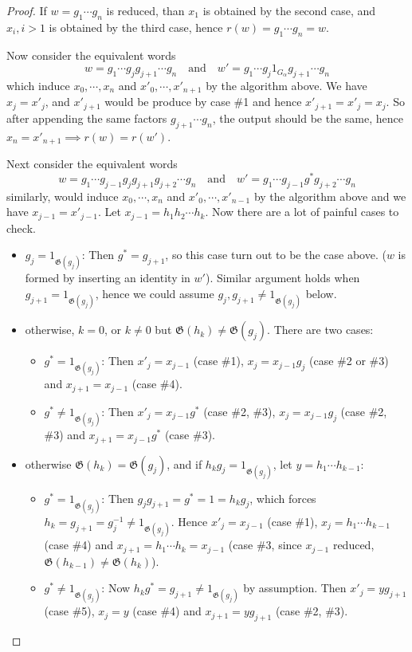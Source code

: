 \documentclass[a4paper,titlepage]{article}
\theoremstyle{remark}
\theoremstyle{definition}
\theoremstyle{theorem}
\newcommand{\gid}{\mathfrak{G}}
\begin{document}
\begin{proof}
    If $w = g_1 \cdots g_n$ is reduced, than $x_1$ is obtained by the second case, and $x_i, i > 1$ is
    obtained by the third case, hence $r(w) = g_1 \cdots g_n = w$.

    Now consider the equivalent words
    \[ w = g_1 \cdots g_j g_{j+1} \cdots g_n \quad\text{and}\quad w' = g_1 \cdots g_j 1_{G_\alpha} g_{j+1} \cdots g_n \]
    which induce $x_0, \cdots, x_n$ and $x'_0, \cdots, x'_{n+1}$ by the algorithm above.
    We have $x_j = x'_j$, and $x'_{j+1}$ would be produce by case \#1 and hence $x'_{j+1} = x'_j = x_j$.
    So after appending the same factors $g_{j+1} \cdots g_n$, the output should be the same, hence
    $x_n = x'_{n+1} \implies r(w) = r(w')$.

    Next consider the equivalent words
    \[ w = g_1 \cdots g_{j-1} g_j g_{j+1} g_{j+2} \cdots g_n 
      \quad\text{and}\quad w' = g_1 \cdots g_{j-1} g^* g_{j+2} \cdots g_n \]
    similarly, would induce $x_0, \cdots, x_n$ and $x'_0, \cdots, x'_{n-1}$ by the algorithm above and
    we have $x_{j-1} = x'_{j-1}$. Let $x_{j-1} = h_1 h_2 \cdots h_k$. 
    Now there are a lot of painful cases to check.
    \begin{itemize}
      \item $g_j = 1_{\gid(g_j)}$: Then $g^* = g_{j+1}$, so this case turn out to be the case above. ($w$
        is formed by inserting an identity in $w'$). Similar argument holds when $g_{j+1} = 1_{\gid(g_j)}$,
        hence we could assume $g_j, g_{j+1} \neq 1_{\gid(g_j)}$ below.
      \item otherwise, $k = 0$, or $k \neq 0$ but $\gid(h_k) \neq \gid(g_j)$. There are two cases:
        \begin{itemize}
          \item $g^* = 1_{\gid(g_j)}$: Then $x'_j = x_{j-1}$ (case \#1), $x_j = x_{j-1} g_j$ (case \#2 
            or \#3) and $x_{j+1} = x_{j-1}$ (case \#4).
          \item $g^* \neq 1_{\gid(g_j)}$: Then $x'_j = x_{j-1} g^*$ (case \#2, \#3),
            $x_j = x_{j-1} g_j$ (case \#2, \#3) and $x_{j+1} = x_{j-1} g^*$ (case \#3).
        \end{itemize}
      \item otherwise $\gid(h_k) = \gid(g_j)$, and if $h_k g_j = 1_{\gid(g_j)}$,
        let $y = h_1 \cdots h_{k-1}$:
        \begin{itemize}
          \item $g^* = 1_{\gid(g_j)}$: Then $g_j g_{j+1} = g^* = 1 = h_k g_j$, which forces
            $h_k = g_{j+1} = g^{-1}_j \neq 1_{\gid(g_j)}$.  
            Hence $x'_j = x_{j-1}$ (case \#1), $x_j = h_1 \cdots h_{k-1}$
            (case \#4) and $x_{j+1} = h_1 \cdots h_k = x_{j-1}$ (case \#3, since $x_{j-1}$ reduced, 
            $\gid(h_{k-1}) \neq \gid(h_k)$).
          \item $g^* \neq 1_{\gid(g_j)}$: 
            Now $h_k g^* = g_{j+1} \neq 1_{\gid(g_j)}$ by assumption. Then
              $x'_j = y g_{j+1}$ (case \#5), $x_j = y$ (case \#4) and $x_{j+1} = y g_{j+1}$ 
                (case \#2, \#3).
        \end{itemize}


\end{itemize}
\end{proof}
\end{document}
